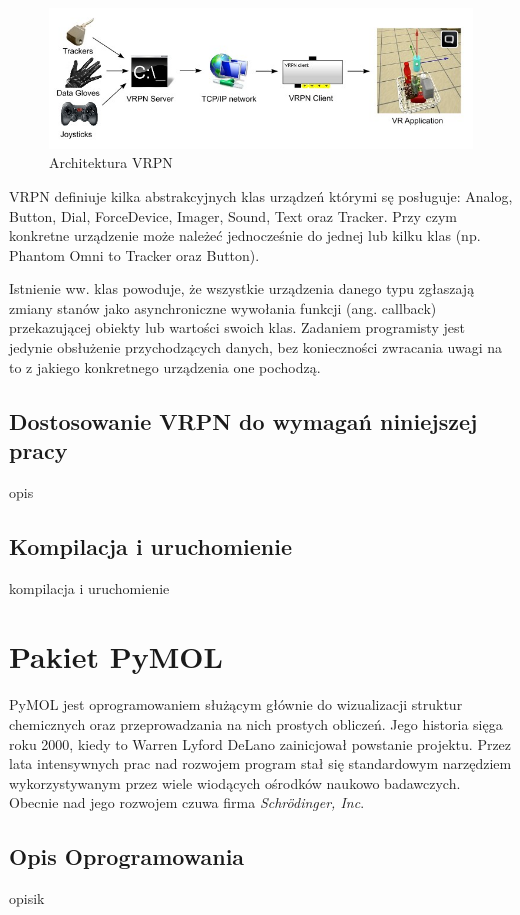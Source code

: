 \documentclass[licencjacka]{pracamgr}
\begin{document}
\begin{figure}[H]
\centering
\includegraphics[scale=0.6,center]{vrpn}
\caption{Architektura VRPN}
\end{figure}

VRPN definiuje kilka abstrakcyjnych klas urządzeń którymi sę posługuje: Analog, Button, Dial, ForceDevice, Imager, Sound, Text oraz Tracker. Przy czym konkretne urządzenie może należeć jednocześnie do jednej lub kilku klas (np. Phantom Omni to Tracker oraz Button). 

Istnienie ww. klas powoduje, że wszystkie urządzenia danego typu zgłaszają zmiany stanów jako asynchroniczne wywołania funkcji (ang. callback) przekazującej obiekty lub wartości swoich klas. Zadaniem programisty jest jedynie obsłużenie przychodzących danych, bez konieczności zwracania uwagi na to z jakiego konkretnego urządzenia one pochodzą.

\section{Dostosowanie VRPN do wymagań niniejszej pracy}
opis

\section{Kompilacja i uruchomienie}
kompilacja i uruchomienie

\chapter{Pakiet PyMOL}
PyMOL jest oprogramowaniem służącym głównie do wizualizacji struktur chemicznych oraz przeprowadzania na nich prostych obliczeń. Jego historia sięga roku 2000, kiedy to Warren Lyford DeLano zainicjował powstanie projektu. Przez lata intensywnych prac nad rozwojem program stał się standardowym narzędziem wykorzystywanym przez wiele wiodących ośrodków naukowo badawczych. Obecnie nad jego rozwojem czuwa firma \textit{Schrödinger, Inc}.

\section{Opis Oprogramowania}
opisik
\end{document}
